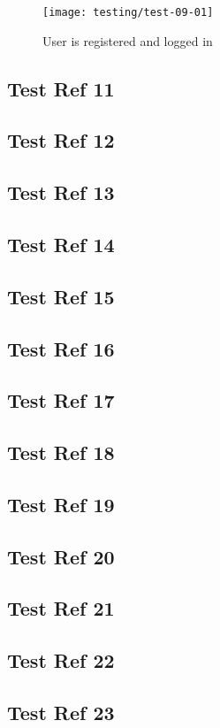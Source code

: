 \begin{figure}[H]
\centering
\texttt{[image: testing/test-09-01]}
\caption{User is registered and logged in}
\label{test-09-02}
\end{figure}

\subsection{Test Ref 11}
\subsection{Test Ref 12}
\subsection{Test Ref 13}
\subsection{Test Ref 14}
\subsection{Test Ref 15}
\subsection{Test Ref 16}
\subsection{Test Ref 17}
\subsection{Test Ref 18}
\subsection{Test Ref 19}
\subsection{Test Ref 20}
\subsection{Test Ref 21}
\subsection{Test Ref 22}
\subsection{Test Ref 23}
